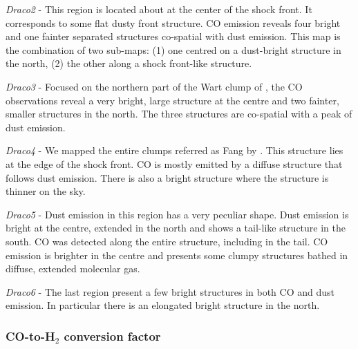 \documentclass[traditabstract]{aa}
\begin{document}
\noindent \textit{Draco2} - This region is located about at the center of the shock front. It corresponds to some flat dusty front structure. CO emission reveals four bright and one fainter separated structures co-spatial with dust emission. This map is the combination of two sub-maps: (1) one centred on a dust-bright structure in the north, (2) the other along a shock front-like structure.
\medskip

\noindent \textit{Draco3} - Focused on the northern part of the Wart clump of \cite{Mebold_1985}, the CO observations reveal a very bright, large structure at the centre and two fainter, smaller structures in the north. The three structures are co-spatial with a peak of dust emission.
\medskip

\noindent \textit{Draco4} - We mapped the entire clumps referred as Fang by \cite{Mebold_1985}. This structure lies at the edge of the shock front. CO is mostly emitted by a diffuse structure that follows dust emission. There is also a bright structure where the structure is thinner on the sky.
\medskip

\noindent \textit{Draco5} - Dust emission in this region has a very peculiar shape. Dust emission is bright at the centre, extended in the north and shows a tail-like structure in the south. CO was detected along the entire structure, including in the tail. CO emission is brighter in the centre and presents some clumpy structures bathed in diffuse, extended molecular gas.
\medskip

\noindent \textit{Draco6} - The last region present a few bright structures in both CO and dust emission. In particular there is an elongated bright structure in the north.


      \subsubsection{CO-to-H$_2$ conversion factor}
\end{document}
